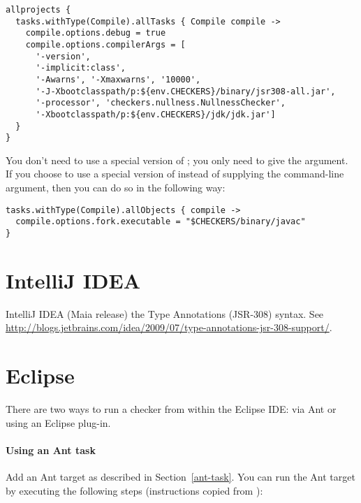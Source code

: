 \begin{Verbatim}
allprojects {
  tasks.withType(Compile).allTasks { Compile compile ->
    compile.options.debug = true
    compile.options.compilerArgs = [
      '-version',
      '-implicit:class',
      '-Awarns', '-Xmaxwarns', '10000',
      '-J-Xbootclasspath/p:${env.CHECKERS}/binary/jsr308-all.jar',
      '-processor', 'checkers.nullness.NullnessChecker',
      '-Xbootclasspath/p:${env.CHECKERS}/jdk/jdk.jar']
  }
}
\end{Verbatim}

You don't need to use a special version of ; you only need to
give the  argument.  If you choose to use a
special version of  instead of supplying the command-line
argument, then you can do so in the following way:

\begin{Verbatim}
tasks.withType(Compile).allObjects { compile ->
  compile.options.fork.executable = "$CHECKERS/binary/javac"
}
\end{Verbatim}


\section{IntelliJ IDEA\label{intellij}}

IntelliJ IDEA (Maia release)
the Type Annotations (JSR-308) syntax.
See \url{http://blogs.jetbrains.com/idea/2009/07/type-annotations-jsr-308-support/}.

\section{Eclipse\label{eclipse}}

There are two ways to run a checker from within the Eclipse IDE:  via Ant
or using an Eclipse plug-in.


\paragraph{Using an Ant task}

Add an Ant target as described in Section~\ref{ant-task}.  You can
run the Ant target by executing the following steps
(instructions copied from
):

